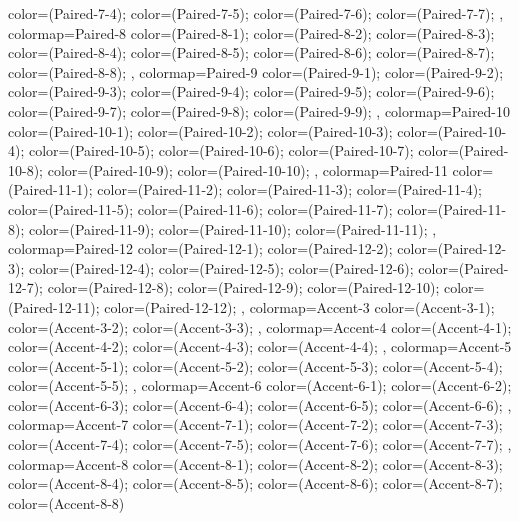 {{color=(Paired-7-4);
color=(Paired-7-5);
color=(Paired-7-6);
color=(Paired-7-7);
},
colormap={Paired-8}{
color=(Paired-8-1);
color=(Paired-8-2);
color=(Paired-8-3);
color=(Paired-8-4);
color=(Paired-8-5);
color=(Paired-8-6);
color=(Paired-8-7);
color=(Paired-8-8);
},
colormap={Paired-9}{
color=(Paired-9-1);
color=(Paired-9-2);
color=(Paired-9-3);
color=(Paired-9-4);
color=(Paired-9-5);
color=(Paired-9-6);
color=(Paired-9-7);
color=(Paired-9-8);
color=(Paired-9-9);
},
colormap={Paired-10}{
color=(Paired-10-1);
color=(Paired-10-2);
color=(Paired-10-3);
color=(Paired-10-4);
color=(Paired-10-5);
color=(Paired-10-6);
color=(Paired-10-7);
color=(Paired-10-8);
color=(Paired-10-9);
color=(Paired-10-10);
},
colormap={Paired-11}{
color=(Paired-11-1);
color=(Paired-11-2);
color=(Paired-11-3);
color=(Paired-11-4);
color=(Paired-11-5);
color=(Paired-11-6);
color=(Paired-11-7);
color=(Paired-11-8);
color=(Paired-11-9);
color=(Paired-11-10);
color=(Paired-11-11);
},
colormap={Paired-12}{
color=(Paired-12-1);
color=(Paired-12-2);
color=(Paired-12-3);
color=(Paired-12-4);
color=(Paired-12-5);
color=(Paired-12-6);
color=(Paired-12-7);
color=(Paired-12-8);
color=(Paired-12-9);
color=(Paired-12-10);
color=(Paired-12-11);
color=(Paired-12-12);
},
colormap={Accent-3}{
color=(Accent-3-1);
color=(Accent-3-2);
color=(Accent-3-3);
},
colormap={Accent-4}{
color=(Accent-4-1);
color=(Accent-4-2);
color=(Accent-4-3);
color=(Accent-4-4);
},
colormap={Accent-5}{
color=(Accent-5-1);
color=(Accent-5-2);
color=(Accent-5-3);
color=(Accent-5-4);
color=(Accent-5-5);
},
colormap={Accent-6}{
color=(Accent-6-1);
color=(Accent-6-2);
color=(Accent-6-3);
color=(Accent-6-4);
color=(Accent-6-5);
color=(Accent-6-6);
},
colormap={Accent-7}{
color=(Accent-7-1);
color=(Accent-7-2);
color=(Accent-7-3);
color=(Accent-7-4);
color=(Accent-7-5);
color=(Accent-7-6);
color=(Accent-7-7);
},
colormap={Accent-8}{
color=(Accent-8-1);
color=(Accent-8-2);
color=(Accent-8-3);
color=(Accent-8-4);
color=(Accent-8-5);
color=(Accent-8-6);
color=(Accent-8-7);
color=(Accent-8-8)}
}
